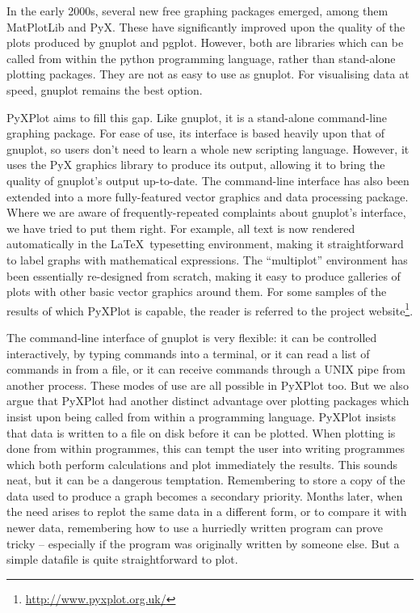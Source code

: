 In the early 2000s, several new free graphing packages emerged, among them {\sc
MatPlotLib} and {\sc PyX}.  These have
significantly improved upon the quality of the plots produced by gnuplot and
pgplot. However, both are libraries which can be called from within the python
programming language, rather than stand-alone plotting packages. They are not
as easy to use as gnuplot.  For visualising data at speed, gnuplot remains the
best option.

{\sc PyXPlot} aims to fill this gap. Like gnuplot, it is a stand-alone
command-line graphing package. For ease of use, its interface is based heavily
upon that of gnuplot, so users don't need to learn a whole new scripting
language. However, it uses the PyX graphics library to produce its output,
allowing it to bring the quality of gnuplot's output up-to-date.  The
command-line interface has also been extended into a more fully-featured vector
graphics and data processing package.  Where we are aware of
frequently-repeated complaints about gnuplot's interface, we have tried to put
them right.  For example, all text is now rendered automatically in the \LaTeX\
typesetting environment, making it straightforward to label graphs with
mathematical expressions. The ``multiplot'' environment has been essentially
re-designed from scratch, making it easy to produce galleries of plots with
other basic vector graphics around them.  For some samples of the results of
which PyXPlot is capable, the reader is referred to the project
website\footnote{\url{http://www.pyxplot.org.uk/}}.

The command-line interface of gnuplot is very flexible: it can be controlled
interactively, by typing commands into a terminal, or it can read a list of
commands in from a file, or it can receive commands through a UNIX pipe from
another process. These modes of use are all possible in PyXPlot too.  But we
also argue that PyXPlot had another distinct advantage over plotting packages
which insist upon being called from within a programming language. PyXPlot
insists that data is written to a file on disk before it can be plotted. When
plotting is done from within programmes, this can tempt the user into writing
programmes which both perform calculations and plot immediately the results.
This sounds neat, but it can be a dangerous temptation. Remembering to store a
copy of the data used to produce a graph becomes a secondary priority.  Months
later, when the need arises to replot the same data in a different form, or to
compare it with newer data, remembering how to use a hurriedly written program
can prove tricky -- especially if the program was originally written by someone
else. But a simple datafile is quite straightforward to plot.

